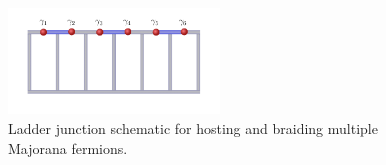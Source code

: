 \begin{figure}
  \includegraphics[width=0.5\textwidth]{./figures/ladder-junction.pdf}
  \caption{Ladder junction schematic for hosting and braiding multiple Majorana fermions.}
  \label{fig:ladder-junction}
\end{figure}
